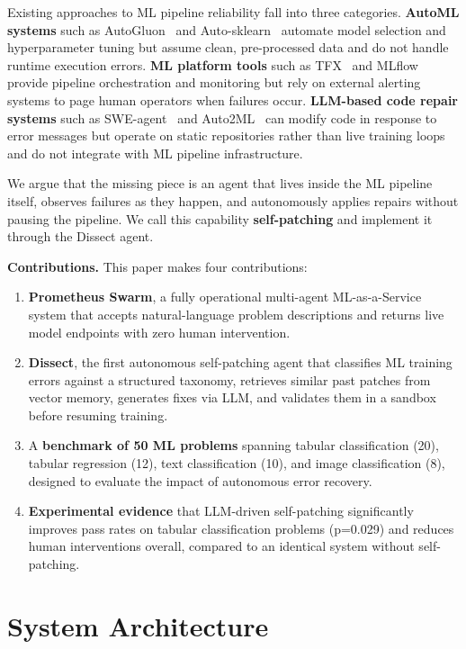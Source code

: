 \documentclass[conference]{IEEEtran}
\begin{document}
Existing approaches to ML pipeline reliability fall into three categories.
\textbf{AutoML systems} such as AutoGluon~\cite{erickson2020autogluon} and
Auto-sklearn~\cite{feurer2015efficient} automate model selection and hyperparameter
tuning but assume clean, pre-processed data and do not handle runtime execution errors.
\textbf{ML platform tools} such as TFX~\cite{baylor2017tfx} and
MLflow~\cite{chen2020mlflow} provide pipeline orchestration and monitoring but rely on
external alerting systems to page human operators when failures occur.
\textbf{LLM-based code repair systems} such as SWE-agent~\cite{yang2024sweagent} and
Auto2ML~\cite{aws2025auto2ml} can modify code in response to error messages but operate
on static repositories rather than live training loops and do not integrate with ML
pipeline infrastructure.

We argue that the missing piece is an agent that lives inside the ML pipeline itself,
observes failures as they happen, and autonomously applies repairs without pausing the
pipeline. We call this capability \textbf{self-patching} and implement it through the
Dissect agent.

\textbf{Contributions.} This paper makes four contributions:

\begin{enumerate}
  \item \textbf{Prometheus Swarm}, a fully operational multi-agent ML-as-a-Service
  system that accepts natural-language problem descriptions and returns live model
  endpoints with zero human intervention.
  \item \textbf{Dissect}, the first autonomous self-patching agent that classifies ML
  training errors against a structured taxonomy, retrieves similar past patches from
  vector memory, generates fixes via LLM, and validates them in a sandbox before
  resuming training.
  \item A \textbf{benchmark of 50 ML problems} spanning tabular classification (20),
  tabular regression (12), text classification (10), and image classification (8),
  designed to evaluate the impact of autonomous error recovery.
  \item \textbf{Experimental evidence} that LLM-driven self-patching significantly
  improves pass rates on tabular classification problems (p=0.029) and reduces human
  interventions overall, compared to an identical system without self-patching.
\end{enumerate}

\section{System Architecture}
\end{document}
